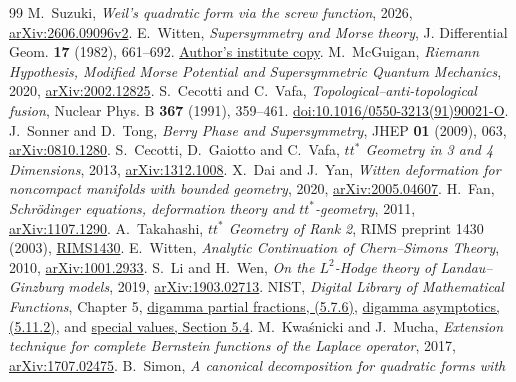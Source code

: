 \begin{thebibliography}{99}
M.~Suzuki, \emph{Weil's quadratic form via the screw function},
2026, \href{https://arxiv.org/abs/2606.09096v2}{arXiv:2606.09096v2}.
E.~Witten, \emph{Supersymmetry and Morse theory},
J. Differential Geom. \textbf{17} (1982), 661--692.
\href{https://www.ias.edu/sites/default/files/sns/files/supersymmetry-and-morse-theory-1982.pdf}{Author's institute copy}.
M.~McGuigan, \emph{Riemann Hypothesis, Modified Morse Potential and Supersymmetric Quantum Mechanics},
2020, \href{https://arxiv.org/abs/2002.12825}{arXiv:2002.12825}.
S.~Cecotti and C.~Vafa, \emph{Topological--anti-topological fusion},
Nuclear Phys. B \textbf{367} (1991), 359--461.
\href{https://doi.org/10.1016/0550-3213(91)90021-O}{doi:10.1016/0550-3213(91)90021-O}.
J.~Sonner and D.~Tong, \emph{Berry Phase and Supersymmetry},
JHEP \textbf{01} (2009), 063,
\href{https://arxiv.org/abs/0810.1280}{arXiv:0810.1280}.
S.~Cecotti, D.~Gaiotto and C.~Vafa, \emph{$tt^*$ Geometry in 3 and 4 Dimensions},
2013, \href{https://arxiv.org/abs/1312.1008}{arXiv:1312.1008}.
X.~Dai and J.~Yan, \emph{Witten deformation for noncompact manifolds with bounded geometry},
2020, \href{https://arxiv.org/abs/2005.04607}{arXiv:2005.04607}.
H.~Fan, \emph{Schr\"odinger equations, deformation theory and $tt^*$-geometry},
2011, \href{https://arxiv.org/abs/1107.1290}{arXiv:1107.1290}.
A.~Takahashi, \emph{$tt^*$ Geometry of Rank 2},
RIMS preprint 1430 (2003),
\href{https://www.kurims.kyoto-u.ac.jp/preprint/file/RIMS1430.pdf}{RIMS1430}.
E.~Witten, \emph{Analytic Continuation of Chern--Simons Theory},
2010, \href{https://arxiv.org/abs/1001.2933}{arXiv:1001.2933}.
S.~Li and H.~Wen, \emph{On the $L^2$-Hodge theory of Landau--Ginzburg models},
2019, \href{https://arxiv.org/abs/1903.02713}{arXiv:1903.02713}.
NIST, \emph{Digital Library of Mathematical Functions}, Chapter 5,
\href{https://dlmf.nist.gov/5.7.E6}{digamma partial fractions, (5.7.6)},
\href{https://dlmf.nist.gov/5.11.E2}{digamma asymptotics, (5.11.2)},
and \href{https://dlmf.nist.gov/5.4}{special values, Section 5.4}.
M.~Kwa\'snicki and J.~Mucha, \emph{Extension technique for complete
Bernstein functions of the Laplace operator},
2017, \href{https://arxiv.org/abs/1707.02475}{arXiv:1707.02475}.
B.~Simon, \emph{A canonical decomposition for quadratic forms with
}
\end{thebibliography}
